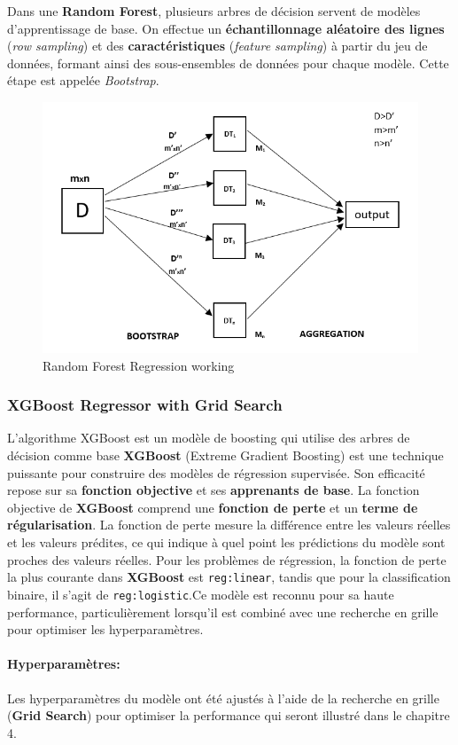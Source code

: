 Dans une \textbf{Random Forest}, plusieurs arbres de décision servent de modèles d'apprentissage de base. On effectue un \textbf{échantillonnage aléatoire des lignes} (\textit{row sampling}) et des \textbf{caractéristiques} (\textit{feature sampling}) à partir du jeu de données, formant ainsi des sous-ensembles de données pour chaque modèle. Cette étape est appelée \textit{Bootstrap}.
\begin{figure}[h!]
	\centering
	\includegraphics[width=0.4\linewidth]{images/schema_random_forest}
	\caption[Random Forest Regression]{Random Forest Regression working}
	\label{fig:schemarandomforest}
\end{figure}

\newpage
\subsubsection{XGBoost Regressor with Grid Search}

L'algorithme XGBoost  est un modèle de boosting qui utilise des arbres de décision comme base
\textbf{XGBoost} (Extreme Gradient Boosting) est une technique puissante pour construire des modèles de régression supervisée. Son efficacité repose sur sa \textbf{fonction objective} et ses \textbf{apprenants de base}. La fonction objective de \textbf{XGBoost} comprend une \textbf{fonction de perte} et un \textbf{terme de régularisation}. La fonction de perte mesure la différence entre les valeurs réelles et les valeurs prédites, ce qui indique à quel point les prédictions du modèle sont proches des valeurs réelles. Pour les problèmes de régression, la fonction de perte la plus courante dans \textbf{XGBoost} est \texttt{reg:linear}, tandis que pour la classification binaire, il s'agit de \texttt{reg:logistic}.Ce modèle est reconnu pour sa haute performance, particulièrement lorsqu'il est combiné avec une recherche en grille pour optimiser les hyperparamètres.


\paragraph*{Hyperparamètres:}
Les hyperparamètres du modèle ont été ajustés à l'aide de la recherche en grille (\textbf{Grid Search}) pour optimiser la performance qui seront illustré dans le chapitre 4.

